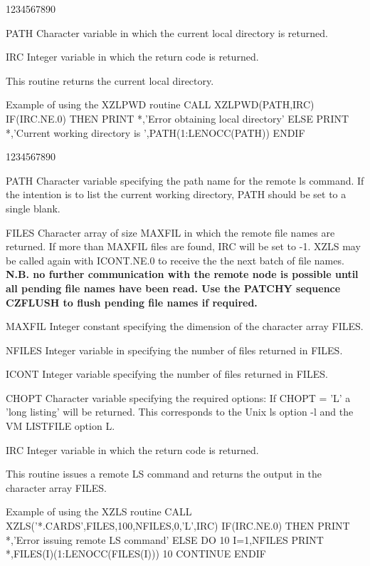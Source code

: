 \begin{DLtt}{1234567890}
\item[PATH]Character variable in which the current local directory
is returned.
\item[IRC]Integer variable in which the return code is returned.
\end{DLtt}
\par
This routine returns the current local directory.
\begin{XMPt}{Example of using the XZLPWD routine}
      CALL XZLPWD(PATH,IRC)
      IF(IRC.NE.0) THEN
         PRINT *,'Error obtaining local directory'
      ELSE
         PRINT *,'Current working directory is ',PATH(1:LENOCC(PATH))
      ENDIF
\end{XMPt}
\begin{DLtt}{1234567890}
\item[PATH]Character variable specifying the path name for the remote
ls command. If the intention is to list the current working
directory, PATH should be set to a single blank.
\item[FILES]Character array of size MAXFIL in which the remote file names
are returned. If more than MAXFIL files are found, IRC will be set
to -1. XZLS may be called again with ICONT.NE.0 to receive the
the next batch of file names.
{\bf N.B. no further communication with the remote node is possible
until all pending file names have been read. Use the PATCHY sequence
CZFLUSH to flush pending file names if required. }
\item[MAXFIL]Integer constant specifying the dimension of the character array
FILES.
\item[NFILES]Integer variable in specifying
the number of files returned in FILES.
\item[ICONT]Integer variable specifying
the number of files returned in FILES.
\item[CHOPT]Character variable specifying the required options:
If CHOPT = 'L' a 'long listing' will be returned.
This corresponds to the Unix ls option -l and the VM LISTFILE option L.
\item[IRC]Integer variable in which the return code is returned.
\end{DLtt}
\par
This routine issues a remote LS command and returns the output
in the character array FILES.
\begin{XMPt}{Example of using the XZLS routine}
      CALL XZLS('*.CARDS',FILES,100,NFILES,0,'L',IRC)
      IF(IRC.NE.0) THEN
         PRINT *,'Error issuing remote LS command'
      ELSE
         DO 10 I=1,NFILES
            PRINT *,FILES(I)(1:LENOCC(FILES(I)))
10       CONTINUE
      ENDIF
\end{XMPt}
